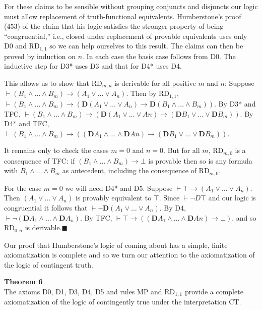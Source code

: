 \documentclass[
  10pt,
  letterpaper,
  DIV=11,
  numbers=noendperiod,
  twoside]{scrartcl}
\begin{document}
For these claims to be sensible without grouping conjuncts and disjuncts
our logic must allow replacement of truth-functional equivalents.
Humberstone's proof (453) of the claim that his logic satisfies the
stronger property of being ``congruential,'' i.e., closed under
replacement of provable equivalents uses only D0 and RD\(_{1,1}\) so we
can help ourselves to this result. The claims can then be proved by
induction on \(n\). In each case the basis case follows from D0. The
inductive step for D3* uses D3 and that for D4* uses D4.

This allows us to show that RD\(_{m,n}\) is derivable for all positive
\(m\) and \(n\): Suppose
\(\vdash (B_1 \wedge {\ldots}\wedge B_m) \rightarrow (A_1\vee {\ldots}\vee A_n)\).
Then by RD\(_{1,1}\),\\
\(\vdash (B_1 \wedge {\ldots}\wedge B_m) \rightarrow (\mathbf{D}(A_1\vee {\ldots}\vee A_n) \rightarrow \mathbf{D}(B_1 \wedge {\ldots}\wedge B_m))\).
By D3* and TFC,
\(\vdash (B_1 \wedge {\ldots}\wedge B_m) \rightarrow (\mathbf{D}(A_1\vee {\ldots}\vee An) \rightarrow (\mathbf{D}B_1 \vee {\ldots}\vee \mathbf{D}B_m))\).
By D4* and TFC,
\(\vdash (B_1 \wedge {\ldots}\wedge B_m) \rightarrow ((\mathbf{D}A_1\wedge {\ldots}\wedge \mathbf{D}An) \rightarrow (\mathbf{D}B_1 \vee {\ldots}\vee \mathbf{D}B_m))\).

It remains only to check the cases \(m{=}0\) and \(n{=}0\). But for all
\(m\), RD\(_{m,0}\) is a consequence of TFC: if
\((B_1\wedge {\ldots}\wedge B_m)\rightarrow \bot\) is provable then so
is any formula with \(B_1\wedge {\ldots}\wedge B_m\) as antecedent,
including the consequence of RD\(_{m,0}\).

For the case \(m=0\) we will need D4* and D5. Suppose
\(\vdash \top \rightarrow (A_1\vee {\ldots}\vee A_n)\). Then
\((A_1\vee {\ldots}\vee A_n)\) is provably equivalent to \(\top\). Since
\(\vdash \neg D\top\) and our logic is congruential it follows that
\(\vdash \neg \mathbf{D}(A_1\vee {\ldots}\vee A_n)\). By D4,
\(\vdash \neg (\mathbf{D}A_1\wedge {\ldots}\wedge \mathbf{D}A_n)\). By
TFC,
\(\vdash \top \rightarrow ( (\mathbf{D}A_1\wedge {\ldots}\wedge \mathbf{D}An) \rightarrow \bot)\),
and so RD\(_{0,n}\) is derivable.\(\blacksquare\)

Our proof that Humberstone's logic of coming about has a simple, finite
axiomatization is complete and so we turn our attention to the
axiomatization of the logic of contingent truth.

\textbf{Theorem 6}\\
The axioms D0, D1, D3, D4, D5 and rules MP and RD\(_{1,1}\) provide a
complete axiomatization of the logic of contingently true under the
interpretation CT.
\end{document}
